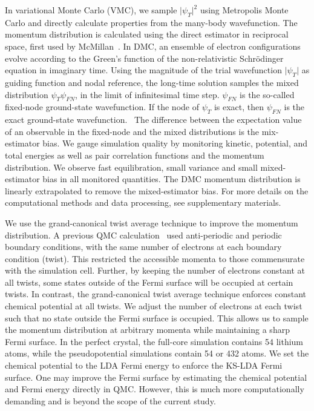 \documentclass[aps,prb,showpacs,preprintnumbers,amsmath,amssymb,superscriptaddress,twocolumn]{revtex4}
\begin{document}
In variational Monte Carlo (VMC), we sample $\vert \psi_T \vert^2$ using Metropolis Monte Carlo and directly calculate properties from the many-body wavefunction. The momentum distribution is calculated using the direct estimator in reciprocal space, first used by McMillan~\cite{W.L.McMillan1965}. In DMC, an ensemble of electron configurations evolve according to the Green's function of the non-relativistic Schr\"odinger equation in imaginary time. Using the magnitude of the trial wavefunction $\vert \psi_T\vert$ as guiding function and nodal reference, the long-time solution samples the mixed distribution $\psi_T\psi_{FN}$, in the limit of infinitesimal time step. $\psi_{FN}$ is the so-called fixed-node ground-state wavefunction. If the node of $\psi_T$ is exact, then $\psi_{FN}$ is the exact ground-state wavefunction.~\cite{Foulkes2001} The difference between the expectation value of an observable in the fixed-node and the mixed distributions is the mix-estimator bias. We gauge simulation quality by monitoring kinetic, potential, and total energies as well as pair correlation functions and the momentum distribution. We observe fast equilibration, small variance and small mixed-estimator bias in all monitored quantities. The DMC momentum distribution is linearly extrapolated to remove the mixed-estimator bias. For more details on the computational methods and data processing, see supplementary materials.

We use the grand-canonical twist average technique to improve the momentum distribution. A previous QMC calculation~\cite{Filippi1999} used anti-periodic and periodic boundary conditions, with the same number of electrons at each boundary condition (twist). This restricted the accessible momenta to those commensurate with the simulation cell. Further, by keeping the number of electrons constant at all twists, some states outside of the Fermi surface will be occupied at certain twists. In contrast, the grand-canonical twist average technique enforces constant chemical potential at all twists. We adjust the number of electrons at each twist such that no state outside the Fermi surface is occupied. This allows us to sample the momentum distribution at arbitrary momenta while maintaining a sharp Fermi surface. In the perfect crystal, the full-core simulation contains 54 lithium atoms, while the pseudopotential simulations contain 54 or 432 atoms. We set the chemical potential to the LDA Fermi energy to enforce the KS-LDA Fermi surface. One may improve the Fermi surface by estimating the chemical potential and Fermi energy directly in QMC. However, this is much more computationally demanding and is beyond the scope of the current study.
\end{document}
